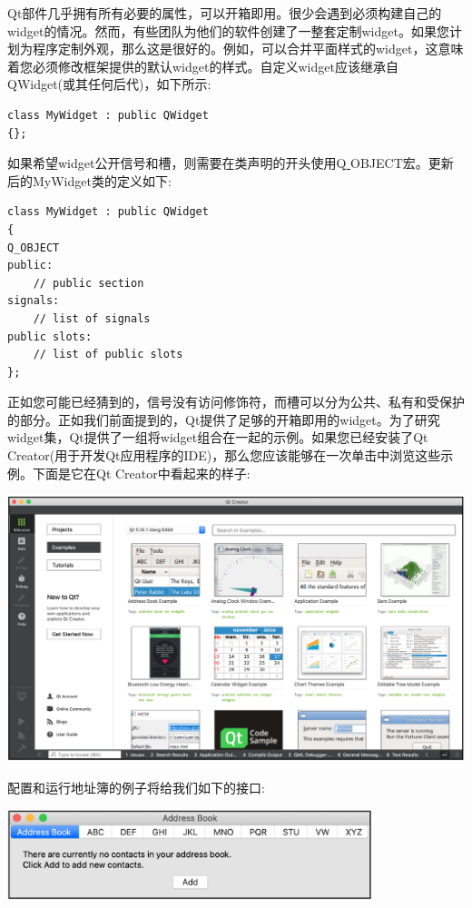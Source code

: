 Qt部件几乎拥有所有必要的属性，可以开箱即用。很少会遇到必须构建自己的widget的情况。然而，有些团队为他们的软件创建了一整套定制widget。如果您计划为程序定制外观，那么这是很好的。例如，可以合并平面样式的widget，这意味着您必须修改框架提供的默认widget的样式。自定义widget应该继承自QWidget(或其任何后代)，如下所示: \par

\begin{lstlisting}[caption={}]
class MyWidget : public QWidget
{};
\end{lstlisting}

如果希望widget公开信号和槽，则需要在类声明的开头使用Q\underline{ }OBJECT宏。更新后的MyWidget类的定义如下: \par

\begin{lstlisting}[caption={}]
class MyWidget : public QWidget
{
Q_OBJECT
public:
	// public section
signals:
	// list of signals
public slots:
	// list of public slots
};
\end{lstlisting}

正如您可能已经猜到的，信号没有访问修饰符，而槽可以分为公共、私有和受保护的部分。正如我们前面提到的，Qt提供了足够的开箱即用的widget。为了研究widget集，Qt提供了一组将widget组合在一起的示例。如果您已经安装了Qt Creator(用于开发Qt应用程序的IDE)，那么您应该能够在一次单击中浏览这些示例。下面是它在Qt Creator中看起来的样子: \par

\begin{center}
	\includegraphics[width=1.0\textwidth]{content/Section-2/Chapter-14/12}
\end{center}

配置和运行地址簿的例子将给我们如下的接口: \par

\begin{center}
	\includegraphics[width=0.8\textwidth]{content/Section-2/Chapter-14/13}
\end{center}

